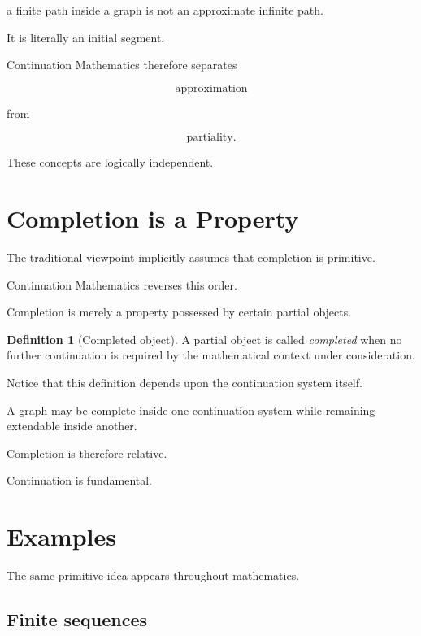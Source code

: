 \documentclass[13pt,openany]{book}
\theoremstyle{plain}
\theoremstyle{definition}
\newtheorem{definition}{Definition}[chapter]
\begin{document}
a finite path inside a graph is not an approximate infinite path.

It is literally an initial segment.

Continuation Mathematics therefore separates

\[
\text{approximation}
\]

from

\[
\text{partiality}.
\]

These concepts are logically independent.

\section{Completion is a Property}

The traditional viewpoint implicitly assumes that completion is primitive.

Continuation Mathematics reverses this order.

Completion is merely a property possessed by certain partial objects.

\begin{definition}[Completed object]
A partial object is called
\emph{completed}
when no further continuation is required by the mathematical context under
consideration.
\end{definition}

Notice that this definition depends upon the continuation system itself.

A graph may be complete inside one continuation system while remaining
extendable inside another.

Completion is therefore relative.

Continuation is fundamental.

\section{Examples}

The same primitive idea appears throughout mathematics.

\subsection*{Finite sequences}
\end{document}
